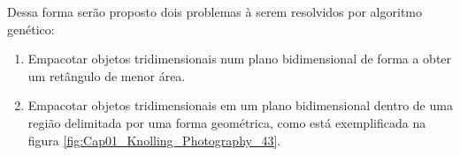 Dessa forma serão proposto dois problemas à serem resolvidos por algoritmo genético:
\begin{enumerate}
\item
  Empacotar objetos tridimensionais num plano bidimensional de forma a obter um retângulo de menor área.
\item
  Empacotar objetos tridimensionais em um plano bidimensional dentro de uma região delimitada por uma forma geométrica, como está exemplificada na figura \ref{fig:Cap01_Knolling_Photography_43}. 
\end{enumerate}




